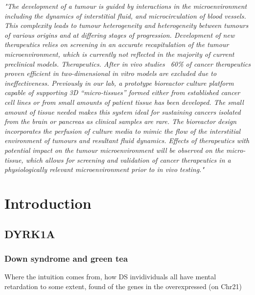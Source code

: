 \documentclass[onecolumn,10pt]{asme2ej}
\begin{document}
	
	\tableofcontents
	\newpage


\textit{"{\small The development of a tumour is guided by interactions in the microenvironment including the dynamics of interstitial fluid, and microcirculation of blood vessels. This complexity leads to tumour heterogeneity and heterogeneity between tumours of various origins and at differing stages of progression. Development of new therapeutics relies on screening in an accurate recapitulation of the tumour microenvironment, which is currently not reflected in the majority of current preclinical models. Therapeutics. After in vivo studies ~60\% of cancer therapeutics proven efficient in two-dimensional in vitro models are excluded due to ineffectiveness. Previously in our lab, a prototype bioreactor culture platform capable of supporting 3D “micro-tissues” formed either from established cancer cell lines or from small amounts of patient tissue has been developed. The small amount of tissue needed makes this system ideal for sustaining cancers isolated from the brain or pancreas as clinical samples are rare. The bioreactor design incorporates the perfusion of culture media to mimic the flow of the interstitial environment of tumours and resultant fluid dynamics. Effects of therapeutics with potential impact on the tumour microenvironment will be observed on the micro-tissue, which allows for screening and validation of cancer therapeutics in a physiologically relevant microenvironment prior to in vivo testing.}"}


\section{Introduction}
\subsection{DYRK1A}
\subsubsection{Down syndrome and green tea}
Where the intuition comes from, how DS invidividuals all have mental retardation to some extent, found of the genes in the overexpressed (on Chr21) 
\end{document}
